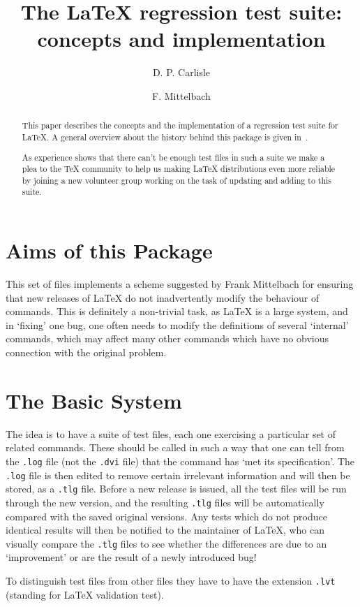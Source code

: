 \documentclass[final]{ltugboat}
\title{The \LaTeX{} regression test suite: concepts and
implementation}
\author{D. P. Carlisle \and  F. Mittelbach}
\begin{document}
\maketitle

\begin{abstract}
  This paper describes the concepts and the implementation of a
  regression test suite for \LaTeX{}. A general overview about the
  history behind this package is given in~\cite{tub:xxx}.

  As experience shows that there can't be enough test files in such a
  suite we make a plea to the \TeX{} community to help us making
  \LaTeX{} distributions even more reliable by joining a new volunteer
  group working on the task of updating and adding to this suite.
\end{abstract}

\section{Aims of this Package}
This set of files implements a scheme suggested by Frank Mittelbach
for ensuring that new releases of \LaTeX{} do not inadvertently modify
the behaviour of commands. This is definitely a non-trivial task, as
\LaTeX{} is a large system, and in `fixing' one bug, one often needs
to modify the definitions of several `internal' commands, which may
affect many other commands which have no obvious connection with the
original problem.

\section{The Basic System}
The idea is to have a suite of test files, each one exercising a
particular set of related commands. These should be called in such a
way that one can tell from the \texttt{.log} file (not the \texttt{.dvi}
file) that the command has `met its specification'. The \texttt{.log}
file is then edited to remove certain irrelevant information and will
then be stored, as a \texttt{.tlg} file. Before a new release is issued,
all the test files will be run through the new version, and the
resulting \texttt{.tlg} files will be automatically compared with the
saved original versions. Any tests which do not produce identical
results will then be notified to the maintainer of
\LaTeX, who can visually compare the \texttt{.tlg} files to see whether the
differences are due to an `improvement' or are the result of a newly
introduced bug! 

To distinguish test files from other files they have to have the
extension \texttt{.lvt} (standing for \LaTeX{} validation test). 
\end{document}
